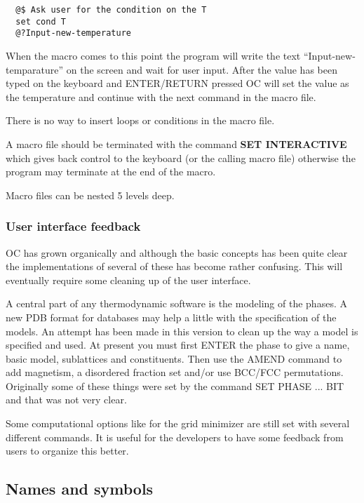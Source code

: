 \documentclass[11pt]{article}
\begin{document}
\begin{verbatim}
  @$ Ask user for the condition on the T
  set cond T
  @?Input-new-temperature

\end{verbatim}

When the macro comes to this point the program will write the text
``Input-new-temparature'' on the screen and wait for user input.
After the value has been typed on the keyboard and ENTER/RETURN
pressed OC will set the value as the temperature and continue with the
next command in the macro file.

There is no way to insert loops or conditions in the macro file.

A macro file should be terminated with the command {\bf SET
  INTERACTIVE} which gives back control to the keyboard (or the
calling macro file) otherwise the program may terminate at the end of
the macro.

Macro files can be nested 5 levels deep.

\subsubsection{User interface feedback}

OC has grown organically and although the basic concepts has been
quite clear the implementations of several of these has become rather
confusing.  This will eventually require some cleaning up of the user
interface.

A central part of any thermodynamic software is the modeling of the
phases.  A new PDB format for databases may help a little with the
specification of the models.  An attempt has been made in this version
to clean up the way a model is specified and used.  At present you
must first ENTER the phase to give a name, basic model, sublattices
and constituents.  Then use the AMEND command to add magnetism, a
disordered fraction set and/or use BCC/FCC permutations.  Originally
some of these things were set by the command SET PHASE ... BIT and
that was not very clear.

Some computational options like for the grid minimizer are still set
with several different commands.  It is useful for the developers to
have some feedback from users to organize this better.

\subsection{Names and symbols}
\end{document}
